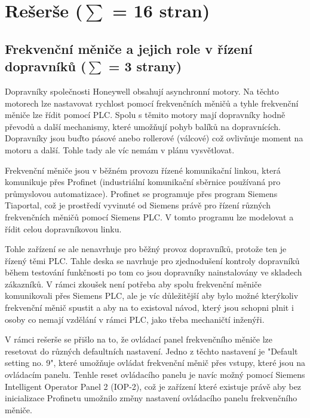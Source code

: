 \chapter{Rešerše ($\sum$ = 16 stran)} \label{chap:Rešerše}
\section{Frekvenční měniče a jejich role v řízení dopravníků ($\sum$ = 3 strany)}\label{sec:FrekvencniMeniceAJejichRole}

Dopravníky společnosti Honeywell obsahují asynchronní motory. Na těchto motorech lze nastavovat rychlost pomocí frekvenčních měničů a tyhle frekvenční měniče lze řídit pomocí PLC. Spolu s těmito motory mají dopravníky hodně převodů a další mechanismy, které umožňují pohyb balíků na dopravnících. Dopravníky jsou buďto pásové anebo rollerové (válcové) což ovlivňuje moment na motoru a další. Tohle tady ale víc nemám v plánu vysvětlovat.

Frekvenční měniče jsou v běžném provozu řízené komunikační linkou, která komunikuje přes Profinet (industriální komunikační sběrnice používaná pro průmyslovou automatizace). Profinet se programuje přes program Siemens Tiaportal, což je prostředí vyvinuté od Siemens právě pro řízení různých frekvenčních měničů pomocí Siemens PLC. V tomto programu lze modelovat a řídit celou dopravníkovou linku.

Tohle zařízení se ale nenavrhuje pro běžný provoz dopravníků, protože ten je řízený těmi PLC. Tahle deska se navrhuje pro zjednodušení kontroly dopravníků během testování funkčnosti po tom co jsou dopravníky nainstalovány ve skladech zákazníků. V rámci zkoušek není potřeba aby spolu frekvenční měniče komunikovali přes Siemens PLC, ale je víc důležitější aby bylo možné kterýkoliv frekvenční měnič spustit a aby na to existoval návod, který jsou schopni plnit i osoby co nemají vzdělání v rámci PLC, jako třeba mechaničtí inženýři.

V rámci rešerše se přišlo na to, že ovládací panel frekvenčního měniče lze resetovat do různých defaultních nastavení. Jedno z těchto nastavení je "Default setting no. 9", které umožňuje ovládat frekvenční měnič přes vstupy, které jsou na ovládacím panelu. Tenhle reset ovládacího panelu je navíc možný pomocí Siemens Intelligent Operator Panel 2 (IOP-2), což je zařízení které existuje právě aby bez inicializace Profinetu umožnilo změny nastavení ovládacího panelu frekvenčního měniče.

